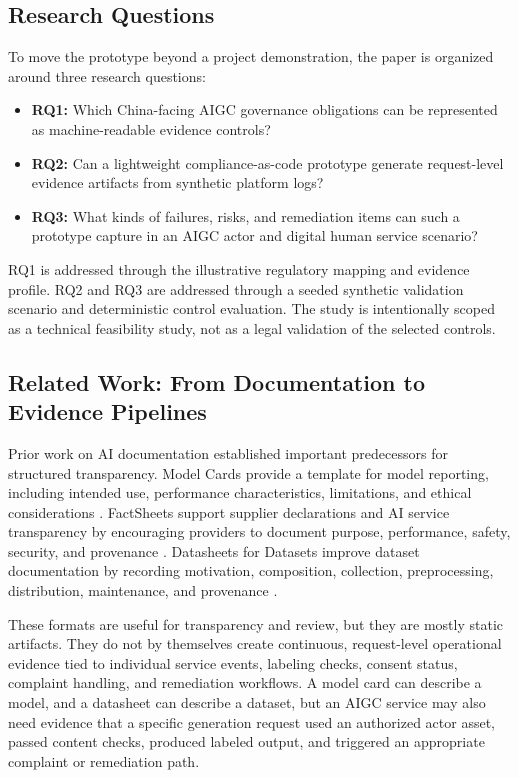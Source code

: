 \documentclass[10pt,journal]{IEEEtran}
\begin{document}
\subsection{Research Questions}

To move the prototype beyond a project demonstration, the paper is organized around three research questions:

\begin{itemize}
  \item \textbf{RQ1:} Which China-facing AIGC governance obligations can be represented as machine-readable evidence controls?
  \item \textbf{RQ2:} Can a lightweight compliance-as-code prototype generate request-level evidence artifacts from synthetic platform logs?
  \item \textbf{RQ3:} What kinds of failures, risks, and remediation items can such a prototype capture in an AIGC actor and digital human service scenario?
\end{itemize}

RQ1 is addressed through the illustrative regulatory mapping and evidence profile. RQ2 and RQ3 are addressed through a seeded synthetic validation scenario and deterministic control evaluation. The study is intentionally scoped as a technical feasibility study, not as a legal validation of the selected controls.


\subsection{Related Work: From Documentation to Evidence Pipelines}

Prior work on AI documentation established important predecessors for structured transparency. Model Cards provide a template for model reporting, including intended use, performance characteristics, limitations, and ethical considerations \cite{mitchell2019modelcards}. FactSheets support supplier declarations and AI service transparency by encouraging providers to document purpose, performance, safety, security, and provenance \cite{arnold2019factsheets}. Datasheets for Datasets improve dataset documentation by recording motivation, composition, collection, preprocessing, distribution, maintenance, and provenance \cite{gebru2021datasheets}.

These formats are useful for transparency and review, but they are mostly static artifacts. They do not by themselves create continuous, request-level operational evidence tied to individual service events, labeling checks, consent status, complaint handling, and remediation workflows. A model card can describe a model, and a datasheet can describe a dataset, but an AIGC service may also need evidence that a specific generation request used an authorized actor asset, passed content checks, produced labeled output, and triggered an appropriate complaint or remediation path.
\end{document}
